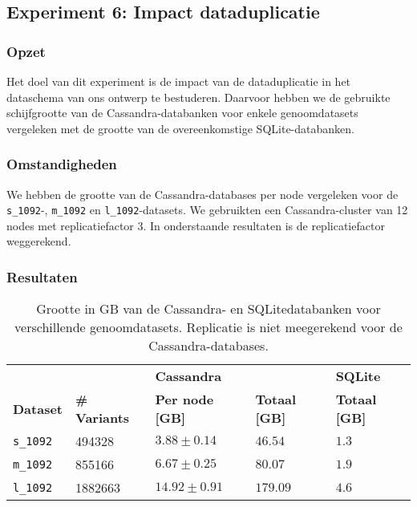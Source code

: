 \subsection{Experiment 6: Impact dataduplicatie}
\label{exp6}

\subsubsection{Opzet}
Het doel van dit experiment is de impact van de dataduplicatie in het dataschema van ons ontwerp te bestuderen. Daarvoor hebben we de gebruikte schijfgrootte van de Cassandra-databanken voor enkele genoomdatasets vergeleken met de grootte van de overeenkomstige SQLite-databanken.

\subsubsection{Omstandigheden}

We hebben de grootte van de Cassandra-databases per node vergeleken voor de \texttt{s\_1092}-,  \texttt{m\_1092} en \texttt{l\_1092}-datasets. We gebruikten een Cassandra-cluster van 12 nodes met replicatiefactor 3. In onderstaande resultaten is de replicatiefactor weggerekend.

\newpage
\subsubsection{Resultaten}

\begin{table}[h]
\centering
\begin{tabular}{@{}lllll@{}}
\cmidrule(l){3-5}
           &     & \multicolumn{2}{|l|}{\textbf{Cassandra}}                                                      & \multicolumn{1}{l|}{\textbf{SQLite}}                             \\ 
\cmidrule(l){1-5}
\multicolumn{1}{|l|}{\textbf{Dataset}} & \multicolumn{1}{l|}{\textbf{\# Variants}} & \multicolumn{1}{l|}{\textbf{Per node [GB]}}               & \multicolumn{1}{l|}{\textbf{Totaal [GB]}} & \multicolumn{1}{l|}{\textbf{Totaal [GB]}} \\ \midrule
\multicolumn{1}{|l|}{\texttt{s\_1092}} & \multicolumn{1}{l|}{494328} & \multicolumn{1}{l|}{$3.88 \pm 0.14$}             & \multicolumn{1}{l|}{$46.54$}          & \multicolumn{1}{l|}{$1.3$}                          \\
\multicolumn{1}{|l|}{\texttt{m\_1092}} & \multicolumn{1}{l|}{855166} & \multicolumn{1}{l|}{$6.67 \pm 0.25$}             & \multicolumn{1}{l|}{$80.07$}          & \multicolumn{1}{l|}{$1.9$}                          \\
\multicolumn{1}{|l|}{\texttt{l\_1092}} & \multicolumn{1}{l|}{1882663} & \multicolumn{1}{l|}{$14.92 \pm 0.91$}             & \multicolumn{1}{l|}{$179.09$}          & \multicolumn{1}{l|}{$4.6$}                          \\
\bottomrule
\end{tabular}
\caption{Grootte in GB van de Cassandra- en SQLitedatabanken voor verschillende genoomdatasets. Replicatie is niet meegerekend voor de Cassandra-databases.}
\end{table}

